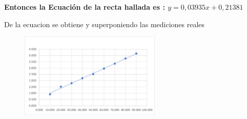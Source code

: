 \textbf{Entonces la Ecuación de la recta hallada es : $y = 0,03935x + 0,21381$}
\item De la ecuacion se obtiene y superponiendo las mediciones reales

\begin{figure}[H]
	\begin{center}
 		\includegraphics[width = 0.6\textwidth]{Imagenes/Imagen3.png}
	\end{center} 
\end{figure}


